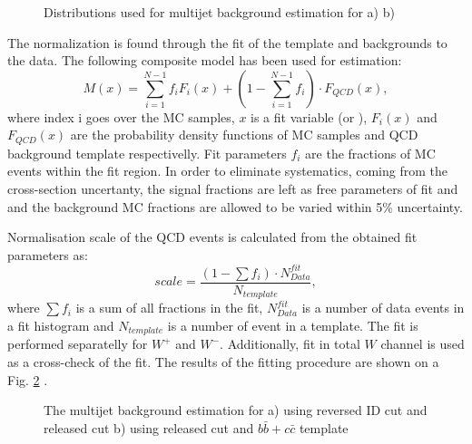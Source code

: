 \begin{figure}[!tbp]
\begin{minipage}[h]{0.49\linewidth}
\end{minipage}
\hfill
\begin{minipage}[h]{0.49\linewidth}
\end{minipage}
\caption{Distributions used for multijet background estimation for a) \wenu b)\wmunu}
\label{ris:FitDistributions}
\end{figure}

The normalization is found through the \chiD fit of the template and backgrounds to the data. The following composite model has been used for estimation:
\begin{equation}
M(x) = \sum_{i=1}^{N-1}f_iF_i(x) + (1- \sum_{i=1}^{N-1} f_i)\cdot F_{QCD}(x),
\end{equation}
where index i goes over the MC samples, $x$ is a fit variable (\etmiss or \mtw), $F_i(x)$ and $ F_{QCD}(x)$ are the probability density functions of MC samples and QCD background template respectivelly. Fit parameters $f_i$ are the fractions of MC events within the fit region. In order to eliminate systematics, coming from the cross-section uncertanty, the signal fractions are left as free parameters of fit and and the background MC fractions are allowed to be varied within 5\% uncertainty. 

Normalisation scale of the QCD events is calculated from the obtained fit parameters as:
\begin{equation}
scale = \frac{(1-\sum f_i) \cdot N^{fit}_{Data}}{N_{template}},
\end{equation}
where $\sum f_i$ is a sum of all fractions in the fit, $N^{fit}_{Data}$ is a number of data events in a fit histogram and $N_{template}$ is a number of event in a template. The fit is performed separatelly for $W^{+}$ and $W^{-}$. Additionally, fit in total $W$ channel is used as a cross-check of the fit.
The results of the fitting procedure are shown on a Fig. \ref{ris:Fit} . 
 
\begin{figure}[!tbp]
\begin{minipage}[h]{0.49\linewidth}
\end{minipage}
\hfill
\begin{minipage}[h]{0.49\linewidth}
\end{minipage}
\caption{The multijet background estimation for a) \wenu using reversed ID cut and released \etmiss cut b) \wmunu using released \mtw cut and $b\bar{b}+c\bar{c}$ template}
\label{ris:Fit}
\end{figure}

